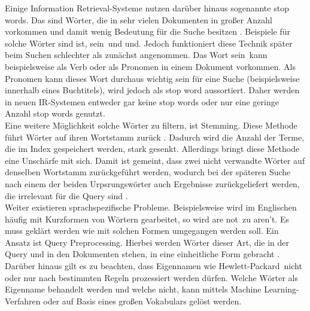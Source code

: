 Einige Information Retrieval-Systeme nutzen darüber hinaus sogenannte \glqq stop words\grqq. Das sind Wörter, die in sehr vielen Dokumenten in großer Anzahl vorkommen und damit wenig Bedeutung für die Suche besitzen \cite{IR_Intro_Cambridge}. Beispiele für solche Wörter sind \glqq ist\grqq, \glqq sein\grqq\ und \glqq und\grqq. Jedoch funktioniert diese Technik später beim Suchen schlechter als zunächst angenommen. Das Wort \glqq sein\grqq\ kann beispielsweise als Verb oder als Pronomen in einem Dokument vorkommen. Als Pronomen kann dieses Wort durchaus wichtig sein für eine Suche (beispielsweise innerhalb eines Buchtitels), wird jedoch als stop word aussortiert. Daher werden in neuen IR-Systemen entweder gar keine stop words oder nur eine geringe Anzahl stop words genutzt.
\\
Eine weitere Möglichkeit solche Wörter zu filtern, ist \glqq Stemming\grqq .
Diese Methode führt Wörter auf ihren Wortstamm zurück \cite{IR_Intro_Cambridge} \cite{IR_Uni_Bamberg}. Dadurch wird die Anzahl der Terme, die im Index gespeichert werden, stark gesenkt. Allerdings bringt diese Methode eine Unschärfe mit sich. Damit ist gemeint, dass zwei nicht verwandte Wörter auf denselben Wortstamm zurückgeführt werden, wodurch bei der späteren Suche nach einem der beiden Urpsrungswörter auch Ergebnisse zurückgeliefert werden, die irrelevant für die Query sind \cite{IR_Intro_Cambridge}.
\\
Weiter existieren sprachspezifische Probleme. Beispielsweise wird im Englischen häufig mit Kurzformen von Wörtern gearbeitet, so wird \glqq are not\grqq\ zu \glqq aren't\grqq. Es muss geklärt werden wie mit solchen Formen umgegangen werden soll. Ein Ansatz ist Query Preprocessing. Hierbei werden Wörter dieser Art, die in der Query und in den Dokumenten stehen, in eine einheitliche Form gebracht \cite{IR_Intro_Cambridge}. Darüber hinaus gilt es zu beachten, dass Eigennamen wie \glqq Hewlett-Packard\grqq\ nicht oder nur nach bestimmten Regeln prozessiert werden dürfen. Welche Wörter als Eigenname behandelt werden und welche nicht, kann mittels Machine Learning-Verfahren oder auf Basis eines großen Vokabulars gelöst werden.